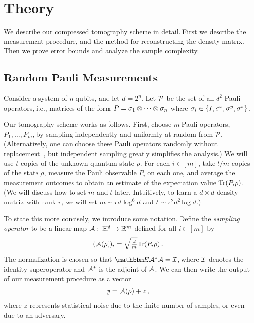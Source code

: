 
\section{Theory} \label{sec-theory}


We describe our compressed tomography scheme in detail.  First we describe the measurement procedure, and the method for reconstructing the density matrix.  Then we prove error bounds and analyze the sample complexity.


\subsection{Random Pauli Measurements}


Consider a system of $n$ qubits, and let $d = 2^n$.  Let $\mathcal{P}$ be the set of all $d^2$ Pauli operators, i.e., matrices of the form $P = \sigma_1 \otimes \cdots \otimes \sigma_n$ where $\sigma_i \in \lbrace I,\sigma^x,\sigma^y,\sigma^z \rbrace$.  

Our tomography scheme works as follows.  First, choose $m$ Pauli operators, $P_1,\ldots,P_m$, by sampling independently and uniformly at random from $\mathcal{P}$.  (Alternatively, one can choose these Pauli operators randomly without replacement~\cite{Gross2010a}, but independent sampling greatly simplifies the analysis.) We will use $t$ copies of the unknown quantum state $\rho$.  For each $i \in [m]$, take $t/m$ copies of the state $\rho$, measure the Pauli observable $P_i$ on each one, and average the measurement outcomes to obtain an estimate of the expectation value $\mathrm{Tr}(P_i\rho)$.  (We will discuss how to set $m$ and $t$ later.  Intuitively, to learn a $d\times d$ density matrix with rank $r$, we will set $m \sim rd\log^6 d$ and $t \sim r^2d^2\log d$.)  

To state this more concisely, we introduce some notation.  Define the \emph{sampling operator} to be a linear map $\mathcal{A}:\: \mathbb{H}^d \rightarrow \mathbb{R}^m$ defined for all $i \in [m]$ by
\begin{equation}\label{eqn-samp-op}
	(\mathcal{A}(\rho))_i = \sqrt{\tfrac{d}{m}} \mathrm{Tr}(P_i\rho) \,.
\end{equation}
The normalization is chosen so that $\EE \calA^*\calA = \calI$, where $\mathcal{I}$ denotes the identity superoperator and $\mathcal{A}^*$ is the adjoint of $\mathcal{A}$.  We can then write the output of our measurement procedure as a vector 
\begin{align}
	y = \mathcal{A}(\rho) + z\,,
\end{align}
where $z$ represents statistical noise due to the finite number of samples, or even due to an adversary.


